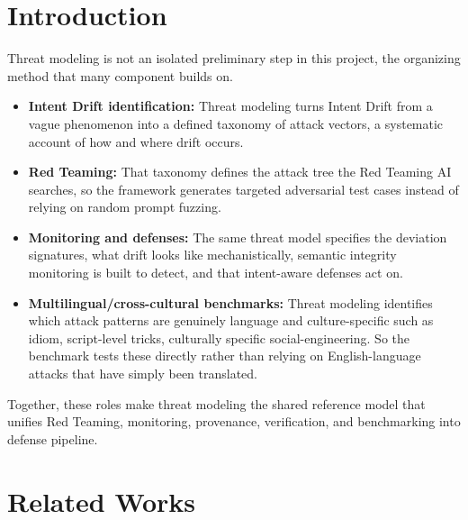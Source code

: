 \documentclass[a4paper,12pt]{report}
\begin{document}
\newpage
\chapter{Introduction}
Threat modeling is not an isolated preliminary step in this project, the organizing method that many component builds on.
\begin{itemize}
    \item \textbf{Intent Drift identification:} Threat modeling turns Intent Drift from a vague phenomenon into a defined taxonomy of attack vectors, a systematic account of how and where drift occurs.

    \item \textbf{Red Teaming:} That taxonomy defines the attack tree the Red Teaming AI searches, so the framework generates targeted adversarial test cases instead of relying on random prompt fuzzing.

    \item \textbf{Monitoring and defenses:} The same threat model specifies the deviation signatures, what drift looks like mechanistically, semantic integrity monitoring is built to detect, and that intent-aware defenses act on.

    \item \textbf{Multilingual/cross-cultural benchmarks:} Threat modeling identifies which attack patterns are genuinely language and culture-specific such as idiom, script-level tricks, culturally specific social-engineering. So the benchmark tests these directly rather than relying on English-language attacks that have simply been translated.
\end{itemize}

Together, these roles make threat modeling the shared reference model that unifies Red Teaming, monitoring, provenance, verification, and benchmarking into defense pipeline.

\chapter{Related Works}
\end{document}
